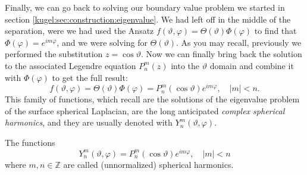 Finally, we can go back to solving our boundary value problem we started in
section \ref{kugel:sec:construction:eigenvalue}. We had left off in the middle
of the separation, were we had used the Ansatz $f(\vartheta, \varphi) =
\Theta(\vartheta) \Phi(\varphi)$ to find that $\Phi(\varphi) = e^{im\varphi}$,
and we were solving for $\Theta(\vartheta)$.  As you may recall, previously we
performed the substitution $z = \cos \vartheta$. Now we can finally bring back
the solution to the associated Legendre equation $P^m_n(z)$ into the $\vartheta$
domain and combine it with $\Phi(\varphi)$ to get the full result:
\begin{equation*}
    f(\vartheta, \varphi)
      = \Theta(\vartheta)\Phi(\varphi)
      = P^m_n (\cos \vartheta) e^{im\varphi}, \quad |m|<n.
\end{equation*}
This family of functions, which recall are the solutions of the eigenvalue
problem of the surface spherical Laplacian, are the long anticipated
\emph{complex spherical harmonics}, and they are usually denoted with
$Y^m_n(\vartheta, \varphi)$.

\begin{definition}
  \label{kugel:def:spherical-harmonics}
  The functions
  \begin{equation*}
    Y^m_n (\vartheta, \varphi) = P^m_n(\cos \vartheta) e^{im\varphi}, \quad |m|<n
  \end{equation*}
  where $m, n \in \mathbb{Z}$ are called (unnormalized) spherical
  harmonics.
\end{definition}

